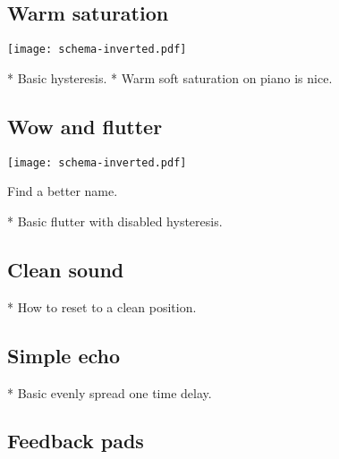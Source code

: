 \documentclass[11pt]{article}
\begin{document}
\vspace{5mm}
\noindent
\begin{minipage}[t]{0.45\textwidth}

\subsection{Warm saturation}

\vspace{5mm}
\begin{center}
  \texttt{[image: schema-inverted.pdf]}
\end{center}

* Basic hysteresis.
* Warm soft saturation on piano is nice.

\end{minipage}%
\begin{minipage}{0.05\textwidth}
\phantom{ }
\end{minipage}%
\begin{minipage}[t]{0.45\textwidth}
\subsection{Wow and flutter}

\vspace{5mm}
\begin{center}
  \texttt{[image: schema-inverted.pdf]}
\end{center}

Find a better name.

* Basic flutter with disabled hysteresis.
\end{minipage}

\newpage


\subsection{Clean sound}

* How to reset to a clean position.

\subsection{Simple echo}

* Basic evenly spread one time delay.

\subsection{Feedback pads}
\end{document}
